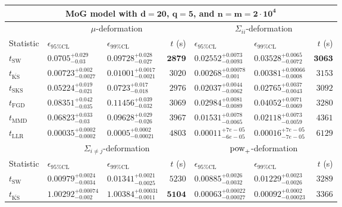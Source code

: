 \begin{tabular}{l|llr|llr}
	\toprule
	\multicolumn{7}{c}{{\bf MoG model with $\mathbf{d=20}$, $\mathbf{q=5}$, and $\mathbf{n=m=2\cdot 10^{4}}$}} \\
	\toprule
	\multicolumn{1}{c}{} & \multicolumn{3}{c}{$\mu$-deformation} & \multicolumn{3}{c}{$\Sigma_{ii}$-deformation} \\
	Statistic & $\epsilon_{95\%\mathrm{CL}}$ & $\epsilon_{99\%\mathrm{CL}}$ & $t$ (s) & $\epsilon_{95\%\mathrm{CL}}$ & $\epsilon_{99\%\mathrm{CL}}$ & $t$ (s) \\
	\midrule
	$t_{\mathrm{SW}}$ & $0.0705_{-0.03}^{+0.029}$ & $0.09728_{-0.027}^{+0.028}$ & ${\mathbf{2879}}$ & $0.02552_{-0.0093}^{+0.0073}$ & $0.03528_{-0.0072}^{+0.0065}$ & ${\mathbf{3063}}$ \\
	$t_{\overline{\mathrm{KS}}}$ & ${\mathbf{0.00723_{-0.0027}^{+0.002}}}$ & ${\mathbf{0.01001_{-0.0021}^{+0.0017}}}$ & $3020$ & ${\mathbf{0.00268_{-0.001}^{+0.00078}}}$ & ${\mathbf{0.00381_{-0.0008}^{+0.00066}}}$ & $3153$ \\
	$t_{\mathrm{SKS}}$ & $0.05224_{-0.021}^{+0.019}$ & $0.0723_{-0.018}^{+0.017}$ & $2976$ & $0.02037_{-0.0062}^{+0.0044}$ & $0.02765_{-0.0043}^{+0.0037}$ & $3092$ \\
	$t_{\mathrm{FGD}}$ & $0.08351_{-0.035}^{+0.042}$ & $0.11456_{-0.032}^{+0.039}$ & $3069$ & $0.02984_{-0.0089}^{+0.0081}$ & $0.04052_{-0.0069}^{+0.0071}$ & $3280$ \\
	$t_{\mathrm{MMD}}$ & $0.06823_{-0.03}^{+0.033}$ & $0.09628_{-0.026}^{+0.029}$ & $3967$ & $0.01531_{-0.0065}^{+0.0078}$ & $0.02118_{-0.0059}^{+0.0073}$ & $4361$ \\
	$t_{\mathrm{LLR}}$ & $0.00035_{-0.0002}^{+0.0002}$ & $0.0005_{-0.00021}^{+0.0002}$ & $4803$ & $0.00011_{-6e-05}^{+7e-05}$ & $0.00016_{-7e-05}^{+7e-05}$ & $6129$ \\
	\toprule
	\multicolumn{1}{c}{} & \multicolumn{3}{c}{$\Sigma_{i\neq j}$-deformation} & \multicolumn{3}{c}{$\rm{pow}_{+}$-deformation} \\
	Statistic & $\epsilon_{95\%\mathrm{CL}}$ & $\epsilon_{99\%\mathrm{CL}}$ & $t$ (s) & $\epsilon_{95\%\mathrm{CL}}$ & $\epsilon_{99\%\mathrm{CL}}$ & $t$ (s) \\
	\midrule
	$t_{\mathrm{SW}}$ & $0.00979_{-0.0034}^{+0.0024}$ & $0.01341_{-0.0025}^{+0.0021}$ & $5230$ & $0.00885_{-0.0032}^{+0.0026}$ & $0.01229_{-0.0026}^{+0.0023}$ & $3289$ \\
	$t_{\overline{\mathrm{KS}}}$ & $1.00292_{-0.002}^{+0.00074}$ & $1.00384_{-0.0011}^{+0.00031}$ & ${\mathbf{5104}}$ & ${\mathbf{0.00063_{-0.00027}^{+0.00022}}}$ & ${\mathbf{0.00092_{-0.00023}^{+0.0002}}}$ & $3366$ \\

\end{tabular}
